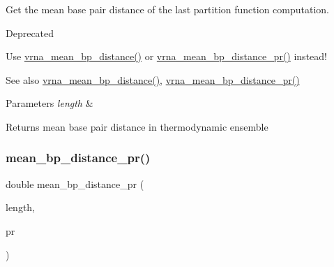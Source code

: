 Get the mean base pair distance of the last partition function computation. 

\begin{DoxyRefDesc}{Deprecated}
\item[\mbox{\hyperlink{deprecated__deprecated000109}{Deprecated}}]Use \mbox{\hyperlink{group__pf__fold_gaa6b8983b559b9ef4b2e1b31113ea317b}{vrna\+\_\+mean\+\_\+bp\+\_\+distance()}} or \mbox{\hyperlink{group__pf__fold_gad3f0c240512e6d43e2e4d4c2076021f5}{vrna\+\_\+mean\+\_\+bp\+\_\+distance\+\_\+pr()}} instead! \end{DoxyRefDesc}
\begin{DoxySeeAlso}{See also}
\mbox{\hyperlink{group__pf__fold_gaa6b8983b559b9ef4b2e1b31113ea317b}{vrna\+\_\+mean\+\_\+bp\+\_\+distance()}}, \mbox{\hyperlink{group__pf__fold_gad3f0c240512e6d43e2e4d4c2076021f5}{vrna\+\_\+mean\+\_\+bp\+\_\+distance\+\_\+pr()}}
\end{DoxySeeAlso}

\begin{DoxyParams}{Parameters}
{\em length} & \\
\hline
\end{DoxyParams}
\begin{DoxyReturn}{Returns}
mean base pair distance in thermodynamic ensemble 
\end{DoxyReturn}
\mbox{\label{group__pf__fold_gad5ba36cef8d01cf4244cc09b9bf1ce1d}} 
\subsubsection{\texorpdfstring{mean\+\_\+bp\+\_\+distance\+\_\+pr()}{mean\_bp\_distance\_pr()}}
{\footnotesize\ttfamily double mean\+\_\+bp\+\_\+distance\+\_\+pr (\begin{DoxyParamCaption}\item[{int}]{length,  }\item[{\mbox{\hyperlink{group__data__structures_ga31125aeace516926bf7f251f759b6126}{F\+L\+T\+\_\+\+O\+R\+\_\+\+D\+BL}} $\ast$}]{pr }\end{DoxyParamCaption})}




